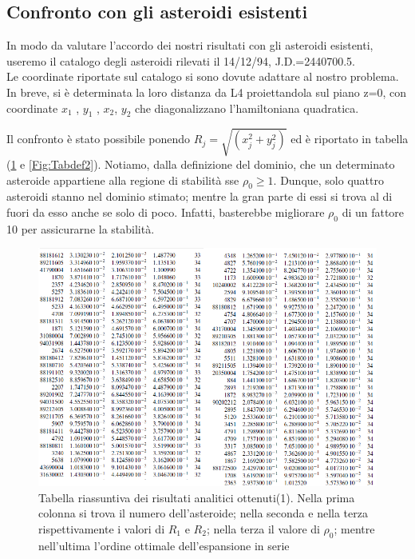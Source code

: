 \documentclass[a4paper,11pt,titlepage]{report}
\theoremstyle{definition}
\theoremstyle{plain}
\begin{document}
\subsection{Confronto con gli asteroidi esistenti}

In modo da valutare l'accordo dei nostri risultati con gli asteroidi esistenti, useremo il catalogo degli asteroidi rilevati il 14/12/94, J.D.=2440700.5. \\Le coordinate riportate sul catalogo si sono dovute adattare al nostro problema. In breve, si è determinata la loro distanza da L4 proiettandola sul piano z=0, con coordinate $ x_1 $ , $ y_1 $ , $ x_2 $, $ y_2 $ che diagonalizzano l'hamiltoniana quadratica.

Il confronto è stato possibile ponendo $R_j = \sqrt{(x_j^2 + y_j^2)} $ ed è riportato in tabella (\ref{Fig:Tabdef1} e \ref{Fig:Tabdef2}). Notiamo, dalla definizione del dominio, che un determinato asteroide appartiene alla regione di stabilità sse $\rho_0 \geq 1$. Dunque, solo quattro asteroidi stanno nel dominio stimato; mentre la gran parte di essi si trova al di fuori da esso anche se solo di poco. Infatti, basterebbe migliorare $\rho_0$ di un fattore 10 per assicurarne la stabilità.

\begin{figure}[h]
	\label{Fig:Tabdef1}
	\centering
	\includegraphics[scale=0.8]{Tabdef1.png}
	\caption{Tabella riassuntiva dei risultati analitici ottenuti(1).
	Nella prima colonna si trova il numero dell'asteroide; nella seconda e nella terza rispettivamente i valori di $R_1$ e $R_2$; nella terza il valore di $\rho_0$; mentre nell'ultima l'ordine ottimale dell'espansione in serie}
\end{figure}
\end{document}
